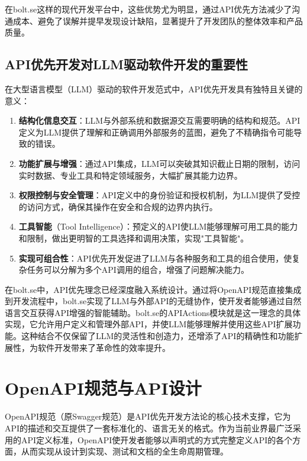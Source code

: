 在bolt.se这样的现代开发平台中，这些优势尤为明显，通过API优先方法减少了沟通成本、避免了误解并提早发现设计缺陷，显著提升了开发团队的整体效率和产品质量。

\subsection{API优先开发对LLM驱动软件开发的重要性}
在大型语言模型（LLM）驱动的软件开发范式中，API优先开发具有独特且关键的意义：

\begin{enumerate}
  \item \textbf{结构化信息交互}：LLM与外部系统和数据源交互需要明确的结构和规范。API定义为LLM提供了理解和正确调用外部服务的蓝图，避免了不精确指令可能导致的错误。
  
  \item \textbf{功能扩展与增强}：通过API集成，LLM可以突破其知识截止日期的限制，访问实时数据、专业工具和特定领域服务，大幅扩展其能力边界。
  
  \item \textbf{权限控制与安全管理}：API定义中的身份验证和授权机制，为LLM提供了受控的访问方式，确保其操作在安全和合规的边界内执行。
  
  \item \textbf{工具智能}（Tool Intelligence）：预定义的API使LLM能够理解可用工具的能力和限制，做出更明智的工具选择和调用决策，实现"工具智能"。
  
  \item \textbf{实现可组合性}：API优先开发促进了LLM与各种服务和工具的组合使用，使复杂任务可以分解为多个API调用的组合，增强了问题解决能力。
\end{enumerate}

在bolt.se中，API优先理念已经深度融入系统设计。通过将OpenAPI规范直接集成到开发流程中，bolt.se实现了LLM与外部API的无缝协作，使开发者能够通过自然语言交互获得API增强的智能辅助。bolt.se的APIActions模块就是这一理念的具体实现，它允许用户定义和管理外部API，并使LLM能够理解并使用这些API扩展功能。这种结合不仅保留了LLM的灵活性和创造力，还增添了API的精确性和功能扩展性，为软件开发带来了革命性的效率提升。

\section{OpenAPI规范与API设计}
OpenAPI规范（原Swagger规范）是API优先开发方法论的核心技术支撑，它为API的描述和交互提供了一套标准化的、语言无关的格式\cite{openapi2023}。作为当前业界最广泛采用的API定义标准，OpenAPI使开发者能够以声明式的方式完整定义API的各个方面，从而实现从设计到实现、测试和文档的全生命周期管理。

